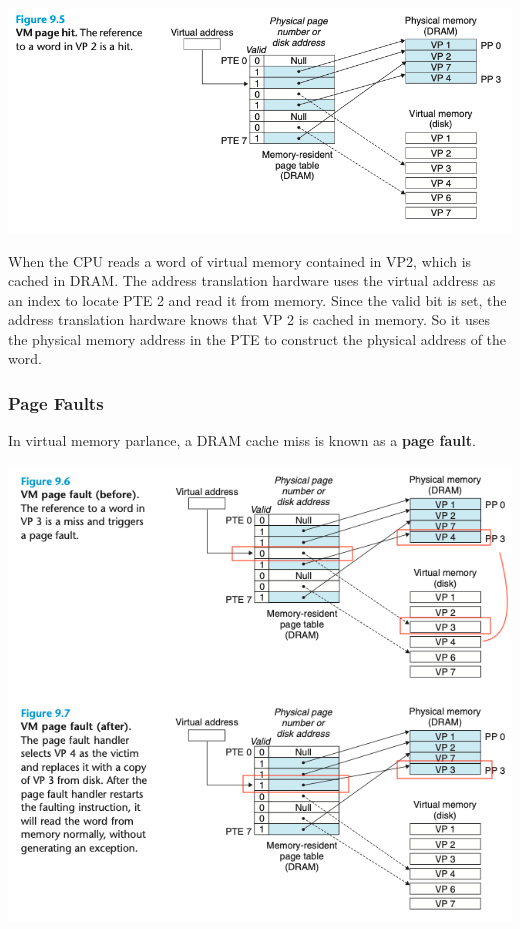 \documentclass[11pt]{article}
\begin{document}
\begin{center}
\includegraphics[width=.9\linewidth]{pics/figure9.5-page-hit.png}
\end{center}

When the CPU reads a word of virtual memory contained in VP2, which is cached in DRAM. The address translation hardware uses the virtual address as an index to locate PTE 2 and read it from memory. Since the valid bit is set, the address translation hardware knows that VP 2 is cached in memory. So it uses the physical memory address in the PTE to construct the physical address of the word.\\

\subsubsection{Page Faults}
\label{sec:org2ae51f1}

In virtual memory parlance, a DRAM cache miss is known as a \textbf{page fault}.\\

\begin{center}
\includegraphics[width=.9\linewidth]{pics/figure9.6-9.7-page-fault.png}
\end{center}
\end{document}

